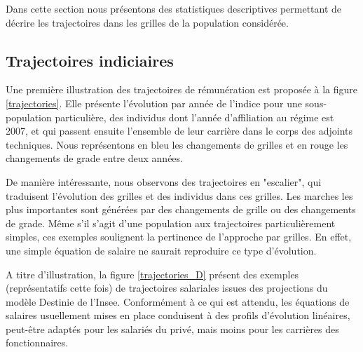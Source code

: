 \documentclass[11pt,a4paper]{article}
\begin{document}
Dans cette section nous présentons des statistiques descriptives permettant de décrire les trajectoires dans les grilles de la population considérée. 

\subsection{Trajectoires indiciaires}

Une première illustration des trajectoires de rémunération est proposée à la figure \ref{trajectories}. Elle présente l'évolution par année de l'indice pour une sous-population particulière, des individus dont l'année d'affiliation au régime est 2007, et qui passent ensuite l'ensemble de leur carrière dans le corps des adjoints techniques. Nous représentons en bleu les changements de grilles et en rouge les changements de grade entre deux années. 

De manière intéressante, nous observons des trajectoires en "escalier", qui traduisent l'évolution des grilles et des individus dans ces grilles. Les marches les plus importantes sont générées par des changements de grille ou des changements de grade. Même s'il s'agit d'une population aux trajectoires particulièrement simples, ces exemples soulignent la pertinence de l'approche par grilles. En effet, une simple équation de salaire ne saurait reproduire ce type d'évolution. 

A titre d'illustration, la figure \ref{trajectories_D} présent des exemples (représentatifs cette fois) de trajectoires salariales issues des projections du modèle Destinie de l'Insee. Conformément à ce qui est attendu, les équations de salaires usuellement mises en place conduisent à des profils d'évolution linéaires, peut-être  adaptés pour les salariés du privé, mais moins pour les carrières des fonctionnaires. 
\end{document}
